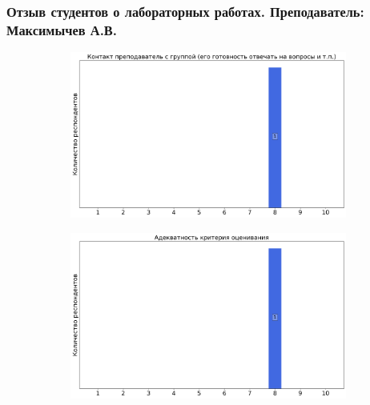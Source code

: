     
	\subsubsection{Отзыв студентов о лабораторных работах. Преподаватель: Максимычев А.В.}
		\begin{figure}[H]
			\centering
			\begin{subfigure}[b]{0.45\textwidth}
				\centering
				\includegraphics[width=\textwidth]{images/2 course/Общая физика - электричество и магнетизм/labniks-marks-Максимычев А.В.-0.png}
			\end{subfigure}
			\begin{subfigure}[b]{0.45\textwidth}
				\centering
				\includegraphics[width=\textwidth]{images/2 course/Общая физика - электричество и магнетизм/labniks-marks-Максимычев А.В.-1.png}
			\end{subfigure}
			\begin{subfigure}[b]{0.45\textwidth}
				\centering

\end{subfigure}
\end{figure}
